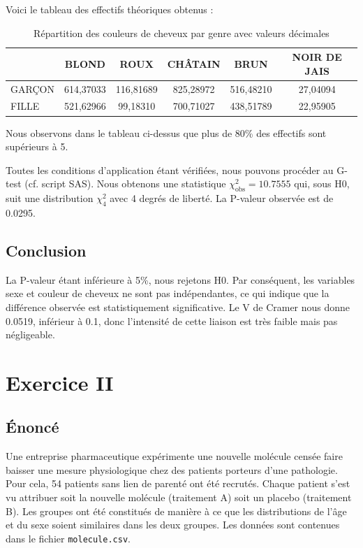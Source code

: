 \documentclass[12pt,a4paper]{article}
\begin{document}
	Voici le tableau des effectifs théoriques obtenus :
	
	\begin{table}[H]
		\centering
		\begin{tabular}{@{}lccccc@{}}
			\toprule
			& \textbf{BLOND}    & \textbf{ROUX}   & \textbf{CHÂTAIN} & \textbf{BRUN}   & \textbf{NOIR DE JAIS} \\ \midrule
			GARÇON & 614,37033         & 116,81689       & 825,28972        & 516,48210       & 27,04094              \\
			FILLE  & 521,62966         & 99,18310        & 700,71027        & 438,51789       & 22,95905              \\ \bottomrule
		\end{tabular}
		\caption{Répartition des couleurs de cheveux par genre avec valeurs décimales}
	\end{table}
	
	Nous observons dans le tableau ci-dessus que plus de 80\% des effectifs sont supérieurs à 5.
	
	Toutes les conditions d'application étant vérifiées, nous pouvons procéder au G-test (cf. script SAS). Nous obtenons une statistique \(\chi^2_{\text{obs}} = 10.7555\) qui, sous H0, suit une distribution \(\chi_{4}^2\) avec 4 degrés de liberté. La P-valeur observée est de 0.0295.
	
	\subsection{Conclusion}
	La P-valeur étant inférieure à 5\%, nous rejetons H0. Par conséquent, les variables sexe et couleur de cheveux ne sont pas indépendantes, ce qui indique que la différence observée est statistiquement significative. Le V de Cramer nous donne 0.0519, inférieur à 0.1, donc l'intensité de cette liaison est très faible mais pas négligeable.

	
	\section{Exercice II}
	
	\subsection{Énoncé}
	Une entreprise pharmaceutique expérimente une nouvelle molécule censée faire baisser une mesure physiologique chez des patients porteurs d’une pathologie. Pour cela, 54 patients sans lien de parenté ont été recrutés. Chaque patient s’est vu attribuer soit la nouvelle molécule (traitement A) soit un placebo (traitement B). Les groupes ont été constitués de manière à ce que les distributions de l’âge et du sexe soient similaires dans les deux groupes. Les données sont contenues dans le fichier \texttt{molecule.csv}.
	
\end{document}
